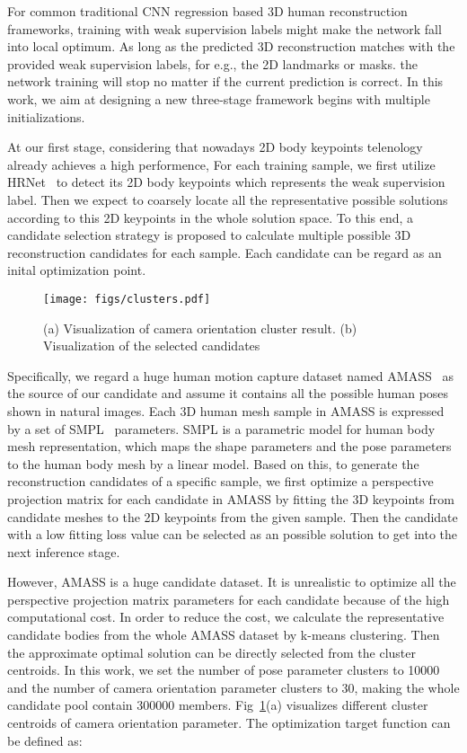 \documentclass[sigconf]{acmart}
\begin{document}
For common traditional CNN regression based 3D human reconstruction frameworks, training with 
weak supervision labels might make the network fall into local optimum. 
As long as the predicted 
3D reconstruction matches with the provided weak supervision labels, for e.g., the 2D landmarks or masks. 
the network training will stop no matter if the current prediction is correct. 
In this work, we aim at designing a new three-stage framework begins with multiple initializations.

At our first stage, considering that nowadays 2D body keypoints telenology already achieves a high performence, 
For each training sample, we first utilize HRNet~\cite{sun2019deep} to detect its 2D body keypoints which 
represents the weak supervision label. Then we expect to coarsely locate all the representative 
possible solutions according to this 2D keypoints 
in the whole solution space. To this end, a candidate selection strategy is proposed to calculate 
multiple possible 3D reconstruction candidates for each sample. Each candidate can be regard as an inital 
optimization point.  

\begin{figure}[t]
	\begin{center}
\texttt{[image: figs/clusters.pdf]}
	\end{center}
	\caption{(a) Visualization of camera orientation cluster result. (b) Visualization of the selected 
		candidates}
	\label{fig:cluster_vis}
\end{figure}

Specifically, we regard a huge human motion capture dataset named AMASS~\cite{mahmood2019amass} as the source 
of our candidate and assume it contains all the possible human poses shown in natural images. Each 3D 
human mesh sample in AMASS is expressed by a set of SMPL~\cite{loper2015smpl} parameters. SMPL is a 
parametric model for human body mesh representation, which maps the shape 
parameters  and the pose parameters  to the human body mesh 
 by a linear model. Based on this, 
to generate the reconstruction candidates of a 
specific sample, we first optimize a perspective projection matrix for each candidate 
in AMASS by fitting the 3D keypoints from candidate meshes to the 2D keypoints from the given sample. 
Then the candidate with a low fitting loss value can be 
selected as an possible solution to get into the next inference stage.

However, AMASS is a huge candidate dataset. It is unrealistic to optimize all the perspective projection 
matrix parameters for each candidate because of the high computational cost. 
In order to reduce the cost, we calculate the representative candidate bodies from the whole AMASS 
dataset by k-means clustering. Then the approximate 
optimal solution can be directly selected from the cluster centroids. In this work, we set the number of 
pose parameter clusters to 10000 and the number of camera orientation parameter clusters to 30, making the 
whole candidate pool contain 300000 members. Fig~\ref{fig:cluster_vis}(a) visualizes different 
cluster centroids of camera orientation parameter. 
The optimization target function can be defined as:
\end{document}
